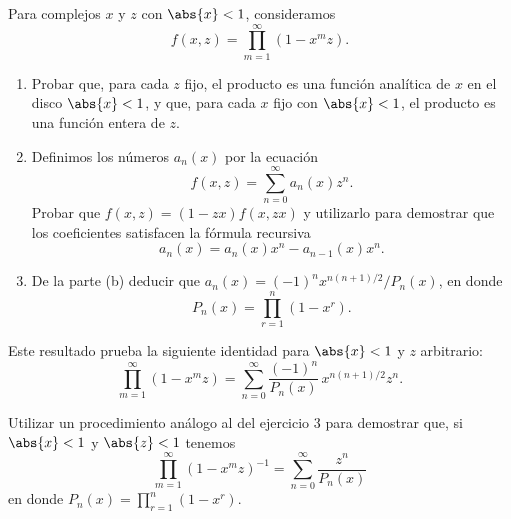    \begin{ejercicio}
        Para complejos $x$ y $z$ con $\abs{x}<1$, consideramos
        \begin{equation*}
            f(x,z)=\prod_{m=1}^{\infty}(1-x^mz).
        \end{equation*}
        \begin{enumerate}
            \item[(a)] Probar que, para cada $z$ fijo, el producto es una función analítica de
            $x$ en el disco $\abs{x}<1$, y que, para cada $x$ fijo con $\abs{x}<1$, el
            producto es una función entera de $z$.
            \item[(b)] Definimos los números $a_n(x)$ por la ecuación
            \begin{equation*}
                f(x,z)=\sum_{n=0}^{\infty}a_n(x)z^n.
            \end{equation*}
            Probar que $f(x,z)=(1-zx)f(x,zx)$ y utilizarlo para demostrar que los coeficientes
            satisfacen la fórmula recursiva
            \begin{equation*}
                a_n(x)=a_n(x)x^n-a_{n-1}(x)x^n.
            \end{equation*}
            \item[(c)] De la parte (b) deducir que $a_n(x)=(-1)^nx^{n(n+1)/2}/P_n(x)$, en donde
            \begin{equation*}
                P_n(x)=\prod_{r=1}^{n}(1-x^r).
            \end{equation*}
        \end{enumerate}
        Este resultado prueba la siguiente identidad para $\abs{x}<1$ y $z$ arbitrario:
        \begin{equation*}
            \prod_{m=1}^{\infty}(1-x^mz)=\sum_{n=0}^{\infty}\frac{(-1)^n}{P_n(x)}\,x^{n(n+1)/2}z^n.
        \end{equation*}
    \end{ejercicio}

    \begin{ejercicio}
        Utilizar un procedimiento análogo al del ejercicio 3 para demostrar que, si $\abs{x}<1$
        y $\abs{z}<1$ tenemos
        \begin{equation*}
            \prod_{m=1}^{\infty}(1-x^mz)^{-1}=\sum_{n=0}^{\infty}\frac{z^n}{P_n(x)}
        \end{equation*}
        en donde $P_n(x)=\prod_{r=1}^{n}(1-x^r)$.
    \end{ejercicio}

